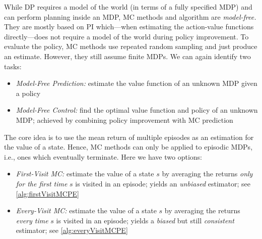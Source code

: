 	While \ac{DP} requires a model of the world (in terms of a fully specified \ac{MDP}) and can perform planning inside an \ac{MDP}, \ac{MC} methods and algorithm are \emph{model-free.} They are mostly based on \ac{PI} which---when estimating the action-value functions directly---does not require a model of the world during policy improvement. To evaluate the policy, \ac{MC} methods use repeated random sampling and just produce an estimate. However, they still assume finite \acp{MDP}. We can again identify two tasks:
	\begin{itemize}
		\item \emph{Model-Free Prediction:} estimate the value function of an unknown \ac{MDP} given a policy
		\item \emph{Model-Free Control:} find the optimal value function and policy of an unknown \ac{MDP}; achieved by combining policy improvement with \ac{MC} prediction
	\end{itemize}
	The core idea is to use the mean return of multiple episodes as an estimation for the value of a state. Hence, \ac{MC} methods can only be applied to episodic \acp{MDP}, i.e., ones which eventually terminate. Here we have two options:
	\begin{itemize}
		\item \emph{First-Visit \ac{MC}:} estimate the value of a state \(s\) by averaging the returns \emph{only for the first time} \(s\) is visited in an episode; yields an \emph{unbiased} estimator; see \autoref{alg:firstVisitMCPE}
		\item \emph{Every-Visit \ac{MC}:} estimate the value of a state \(s\) by averaging the returns \emph{every time} \(s\) is visited in an episode; yields a \emph{biased} but still \emph{consistent} estimator; see \autoref{alg:everyVisitMCPE}
	\end{itemize}


